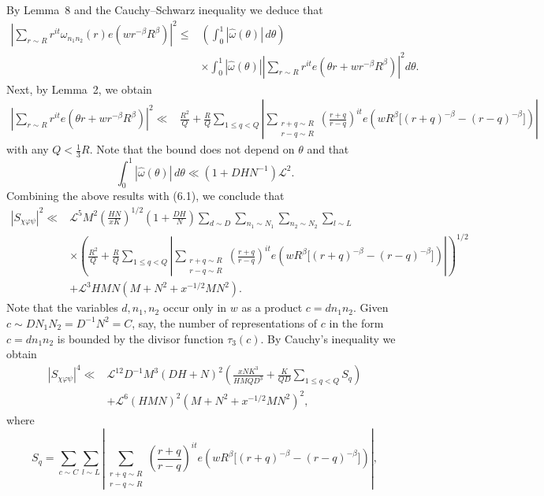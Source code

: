 \documentclass[10pt]{article}
\begin{document}
By Lemma~8 and the Cauchy--Schwarz inequality we deduce that
\[
\begin{aligned}
\left|\sum_{r\sim R}r^{it}\omega_{n_1n_2}(r)
 e(wr^{-\beta}R^\beta)\right|^2
\le{}&\left(\int_0^1|\widehat\omega(\theta)|\,d\theta\right)\\
&\times\int_0^1|\widehat\omega(\theta)|
 \left|\sum_{r\sim R}r^{it}
 e(\theta r+wr^{-\beta}R^\beta)\right|^2d\theta.
\end{aligned}
\]
Next, by Lemma~2, we obtain
\[
\begin{aligned}
\left|\sum_{r\sim R}r^{it}e(\theta r+wr^{-\beta}R^\beta)\right|^2
\ll{}&\frac{R^2}{Q}+\frac{R}{Q}\sum_{1\le q<Q}
 \left|\sum_{\substack{r+q\sim R\\r-q\sim R}}
 \left(\frac{r+q}{r-q}\right)^{it}
 e\left(wR^\beta\bigl[(r+q)^{-\beta}-(r-q)^{-\beta}\bigr]\right)\right|
\end{aligned}
\]
with any $Q<\frac13R$. Note that the bound does not depend on $\theta$ and
that
\[
 \int_0^1|\widehat\omega(\theta)|\,d\theta
 \ll(1+DHN^{-1})\mathscr L^2.
\]
Combining the above results with (6.1), we conclude that
\[
\begin{aligned}
|S_{\chi\varphi\psi}|^2\ll{}&\mathscr L^5M^2
 \left(\frac{HN}{xK}\right)^{1/2}\left(1+\frac{DH}{N}\right)
 \sum_{d\sim D}\sum_{n_1\sim N_1}\sum_{n_2\sim N_2}\sum_{l\sim L}\\
&\times\left(\frac{R^2}{Q}+\frac{R}{Q}\sum_{1\le q<Q}
 \left|\sum_{\substack{r+q\sim R\\r-q\sim R}}
 \left(\frac{r+q}{r-q}\right)^{it}
 e\left(wR^\beta\bigl[(r+q)^{-\beta}-(r-q)^{-\beta}\bigr]\right)
 \right|\right)^{1/2}\\
&+\mathscr L^3HMN\left(M+N^2+x^{-1/2}MN^2\right).
\end{aligned}
\]
Note that the variables $d,n_1,n_2$ occur only in $w$ as a product
$c=dn_1n_2$. Given $c\sim DN_1N_2=D^{-1}N^2=C$, say, the number of
representations of $c$ in the form $c=dn_1n_2$ is bounded by the divisor
function $\tau_3(c)$. By Cauchy's inequality we obtain
\[
\begin{aligned}
|S_{\chi\varphi\psi}|^4\ll{}&\mathscr L^{12}D^{-1}M^3(DH+N)^2
 \left(\frac{xNK^3}{HMQD^3}+\frac{K}{QD}\sum_{1\le q<Q}S_q\right)\\
&+\mathscr L^6(HMN)^2\left(M+N^2+x^{-1/2}MN^2\right)^2,
\end{aligned}
\]
where
\[
S_q=\sum_{c\sim C}\sum_{l\sim L}
 \left|\sum_{\substack{r+q\sim R\\r-q\sim R}}
 \left(\frac{r+q}{r-q}\right)^{it}
 e\left(wR^\beta\bigl[(r+q)^{-\beta}-(r-q)^{-\beta}\bigr]\right)\right|,
\]
\end{document}
